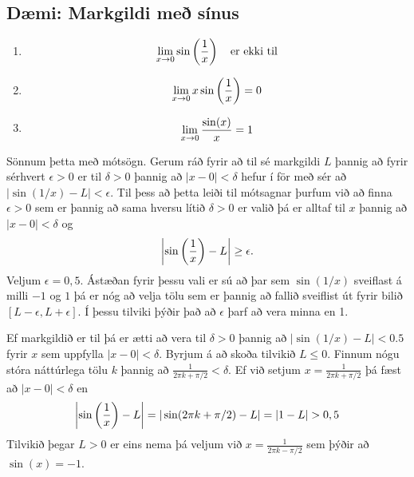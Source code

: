 \documentclass[a4paper,10pt,icelandic]{sphinxmanual}
\begin{document}
\subsection{Dæmi: Markgildi með sínus}
\label{kafli02:daemi-markgildi-me-sinus}\begin{enumerate}
\item {} \begin{gather}
\begin{split}\lim_{x\to 0} \sin\left(\frac 1x\right) \quad \text{er ekki til}\end{split}\notag
\end{gather}
\item {} \begin{gather}
\begin{split}\lim_{x\to 0} x\sin\left(\frac 1x\right) = 0\end{split}\notag
\end{gather}
\item {} \begin{gather}
\begin{split}\lim_{x \to 0} \frac{\sin(x)}{x} = 1\end{split}\notag
\end{gather}
\end{enumerate}

Sönnum þetta með mótsögn. Gerum ráð fyrir að til sé markgildi \(L\) þannig að fyrir
sérhvert \(\epsilon >0\) er til \(\delta>0\) þannig að
\(|x-0|<\delta\) hefur í för með sér að \(|\sin(1/x) - L|<\epsilon\). Til þess
að þetta leiði til mótsagnar þurfum við að finna \(\epsilon>0\) sem er þannig að
sama hversu lítið \(\delta>0\) er valið þá er alltaf til \(x\) þannig að
\(|x-0|<\delta\) og
\begin{gather}
\begin{split}\left|\sin\left(\frac 1x \right)-L\right| \geq \epsilon.\end{split}\notag
\end{gather}
Veljum \(\epsilon = 0,5\). Ástæðan fyrir þessu vali er sú að þar sem
\(\sin(1/x)\) sveiflast á milli \(-1\) og \(1\) þá er nóg að
velja tölu sem er þannig að fallið sveiflist út
fyrir bilið \([L-\epsilon,L+\epsilon]\). Í þessu tilviki þýðir það að
\(\epsilon\) þarf að vera minna en 1.

Ef markgildið er til þá er ætti að vera til \(\delta>0\) þannig að
\(|\sin(1/x)-L|< 0.5\) fyrir \(x\) sem uppfylla \(|x-0|<\delta\).
Byrjum á að skoða tilvikið \(L\leq 0\).
Finnum nógu stóra náttúrlega tölu \(k\)
þannig að \(\frac 1{2\pi k + \pi/2} < \delta\).
Ef við setjum \(x=\frac 1{2\pi k + \pi/2}\)
þá fæst að \(|x-0|<\delta\) en
\begin{gather}
\begin{split}\left|\sin\left(\frac 1x \right) - L\right| =
|\sin(2\pi k +\pi/2) - L|  = |1-L| > 0,5\end{split}\notag
\end{gather}
Tilvikið þegar \(L>0\) er eins nema þá veljum við \(x=\frac 1{2\pi k - \pi/2}\)
sem þýðir að \(\sin(x) = -1\).
\end{document}
